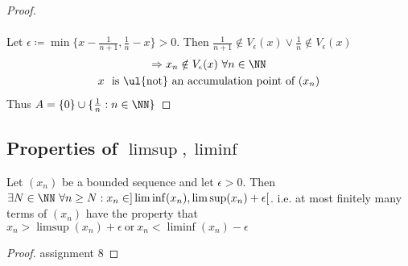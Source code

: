 \documentclass[class=scrartcl, crop=false]{standalone}
\begin{document}
\begin{example}
\begin{enumerate}
\begin{proof}
      \\\\
      Let $\epsilon \coloneqq \min\{x - \frac{1}{n + 1}, \frac{1}{n} - x\} > 0$. Then $\frac{1}{n + 1} \notin V_\epsilon(x) \vee \frac{1}{n} \notin V_\epsilon(x)$ 
      \begin{gather*}
        \Rightarrow x_n \notin V_\epsilon(x) \ \forall n \in \NN \\
        x \ \text{ is \ul{not} an accumulation point of} \ (x_n) \\
      \end{gather*}
      Thus $A = \{0\} \cup \{\frac{1}{n}: n \in \NN\}$
    \end{proof}
  \end{enumerate}
\end{example}

\subsection{Properties of $\limsup, \liminf$}
\begin{theorem}
  Let $(x_n)$ be a bounded sequence and let $\epsilon > 0$. Then $\exists N \in \NN \ \forall n \geq N : x_n \in ]\liminf(x_n), \limsup(x_n) + \epsilon[$. i.e. at most finitely many terms of $(x_n)$ have the property that $x_n > \limsup(x_n) + \epsilon \ \text{or} \ x_n < \liminf(x_n) - \epsilon$
  \begin{proof}
    assignment 8
  \end{proof}
\end{theorem}
\end{document}
